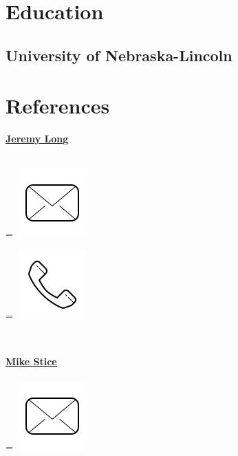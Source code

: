 \documentclass[]{latex/resume}
\begin{document}
\begin{minipage}[t]{0.25\textwidth}
\section{Education} 
    \subsection{University of Nebraska-Lincoln}

    \sectionsep


\section{References}

    \href{}{\textbf{Jeremy Long}} \\
     \\

    \begingroup
        =\hbox{
            \includegraphics[scale=0.1,trim={0 1cm 0cm 0cm}]{latex/icons/mail.png} 
        }
        \parbox{\wd0}{}
    \endgroup
    \begingroup
        =\hbox{ \includegraphics[scale=0.1,trim={0 1.25cm -0.4cm 0cm}]{latex/icons/phone.png}\hspace{0.2cm} }
        \parbox{\wd0}{}
    \endgroup \\

    \sectionsep

    \href{}{\textbf{Mike Stice}} \\
     \\
    \begingroup
        =\hbox{ \includegraphics[scale=0.1,trim={0 1cm 0cm 0cm}]{latex/icons/mail.png}\hspace{0.1cm}  }
        \parbox{\wd0}{}
    \endgroup
    

\end{minipage}
\end{document}
